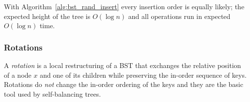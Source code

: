 With Algorithm~\ref{alg:bst_rand_insert} every insertion order is equally likely; the expected height of the tree is \(O(\log n)\) and all operations run in expected \(O(\log n)\) time.


\subsubsection{Rotations}
\begin{definition}[Rotation]
A \emph{rotation} is a local restructuring of a BST that exchanges the relative position of a node \(x\) and one of its children while preserving the in-order sequence of keys.
Rotations do \emph{not} change the in-order ordering of the keys and they are the basic tool used by self-balancing trees.
\end{definition}


